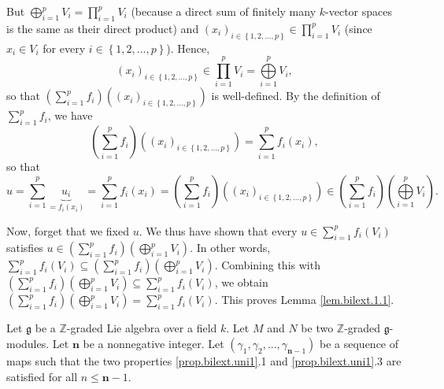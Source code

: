 \documentclass[etingof-lie.tex]{subfiles}
\begin{document}
\begin{noncompile}
\begin{verlong}
But $\bigoplus\limits_{i=1}^{p}V_{i}=\prod\limits_{i=1}^{p}V_{i}$ (because a
direct sum of finitely many $k$-vector spaces is the same as their direct
product) and $\left(  x_{i}\right)  _{i\in\left\{  1,2,...,p\right\}  }%
\in\prod\limits_{i=1}^{p}V_{i}$ (since $x_{i}\in V_{i}$ for every
$i\in\left\{  1,2,...,p\right\}  $). Hence,
\[
\left(  x_{i}\right)  _{i\in\left\{  1,2,...,p\right\}  }\in\prod
\limits_{i=1}^{p}V_{i}=\bigoplus\limits_{i=1}^{p}V_{i},
\]
so that $\left(  \sum\limits_{i=1}^{p}f_{i}\right)  \left(  \left(
x_{i}\right)  _{i\in\left\{  1,2,...,p\right\}  }\right)  $ is well-defined.
By the definition of $\sum\limits_{i=1}^{p}f_{i}$, we have%
\[
\left(  \sum\limits_{i=1}^{p}f_{i}\right)  \left(  \left(  x_{i}\right)
_{i\in\left\{  1,2,...,p\right\}  }\right)  =\sum\limits_{i=1}^{p}f_{i}\left(
x_{i}\right)  ,
\]
so that%
\[
u=\sum\limits_{i=1}^{p}\underbrace{u_{i}}_{=f_{i}\left(  x_{i}\right)  }%
=\sum\limits_{i=1}^{p}f_{i}\left(  x_{i}\right)  =\left(  \sum\limits_{i=1}%
^{p}f_{i}\right)  \left(  \left(  x_{i}\right)  _{i\in\left\{
1,2,...,p\right\}  }\right)  \in\left(  \sum\limits_{i=1}^{p}f_{i}\right)
\left(  \bigoplus\limits_{i=1}^{p}V_{i}\right)  .
\]


Now, forget that we fixed $u$. We thus have shown that every $u\in
\sum\limits_{i=1}^{p}f_{i}\left(  V_{i}\right)  $ satisfies $u\in\left(
\sum\limits_{i=1}^{p}f_{i}\right)  \left(  \bigoplus\limits_{i=1}^{p}%
V_{i}\right)  $. In other words, $\sum\limits_{i=1}^{p}f_{i}\left(
V_{i}\right)  \subseteq\left(  \sum\limits_{i=1}^{p}f_{i}\right)  \left(
\bigoplus\limits_{i=1}^{p}V_{i}\right)  $. Combining this with $\left(
\sum\limits_{i=1}^{p}f_{i}\right)  \left(  \bigoplus\limits_{i=1}^{p}%
V_{i}\right)  \subseteq\sum\limits_{i=1}^{p}f_{i}\left(  V_{i}\right)  $, we
obtain $\left(  \sum\limits_{i=1}^{p}f_{i}\right)  \left(  \bigoplus
\limits_{i=1}^{p}V_{i}\right)  =\sum\limits_{i=1}^{p}f_{i}\left(
V_{i}\right)  $. This proves Lemma \ref{lem.bilext.1.1}.
\end{verlong}

\begin{lemma}
\label{lem.bilext.1.2}Let $\mathfrak{g}$ be a $\mathbb{Z}$-graded Lie algebra
over a field $k$. Let $M$ and $N$ be two $\mathbb{Z}$-graded $\mathfrak{g}%
$-modules. Let $\mathbf{n}$ be a nonnegative integer. Let $\left(  \gamma
_{1},\gamma_{2},...,\gamma_{\mathbf{n}-1}\right)  $ be a sequence of maps such
that the two properties \ref{prop.bilext.uni1}.1 and \ref{prop.bilext.uni1}.3
are satisfied for all $n\leq\mathbf{n}-1$.


\end{lemma}
\end{noncompile}
\end{document}
